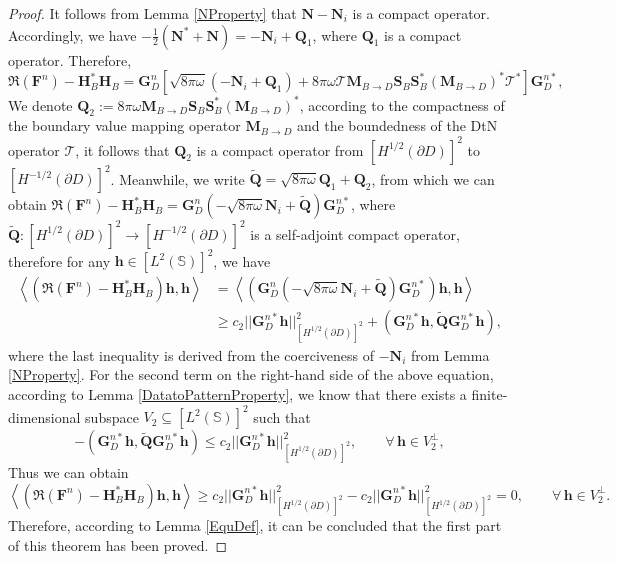 \documentclass[11pt,reqno,twoside]{amsart}
\theoremstyle{definition}
\theoremstyle{remark}
\numberwithin{equation}{section}
\begin{document}
\begin{proof}
It follows from Lemma \ref{NProperty} that $\mathbf N-\mathbf N_{i}$ is a compact operator. Accordingly, we have $-\frac{1}{2}\left( \mathbf N^*+\mathbf N\right)=-\mathbf N_{i} +\mathbf Q_1$, where $\mathbf Q_1$ is a compact operator. Therefore,
	$$
	\Re\left( \mathbf F^n\right)-\mathbf H^*_B\mathbf H_B =\mathbf G_D^n \left[\sqrt{8\pi\omega} \left( -\mathbf N_i+\mathbf Q_1\right) + 8\pi\omega \bm{\mathcal{T}} \mathbf M_{B \to D}\mathbf S_B\mathbf S^*_B\left( \mathbf M_{B \to D}\right) ^* \bm{\mathcal{T}}^* \right] \mathbf G_D^{n*},
	$$
	We denote $\mathbf Q_2:=8\pi\omega \mathbf M_{B \to D}\mathbf S_B\mathbf S^*_B\left( \mathbf M_{B \to D}\right) ^*$, according to the compactness of the boundary value mapping operator $\mathbf M_{B \to D}$ and the boundedness of the DtN operator $\bm{\mathcal{T}}$, it follows that $\mathbf Q_2$ is a compact operator from $ \left[H^{1/2}\left(\partial D \right) \right]^2 $ to $\left[H^{-1/2}\left(\partial D \right) \right]^2$. Meanwhile, we write $\mathbf{\tilde{Q}}=\sqrt{8\pi\omega} \mathbf Q_1+\mathbf Q_2$, from which we can obtain $\Re\left( \mathbf F^n\right)-\mathbf H^*_B\mathbf H_B = \mathbf G_D^n \left( -\sqrt{8\pi\omega} \mathbf N_{i}+\mathbf{\tilde{Q}} \right) \mathbf G_D^{n*}$, where $\mathbf{\tilde{Q}}:\left[H^{1/2}\left(\partial D \right) \right]^2  \to \left[H^{-1/2}\left(\partial D \right) \right]^2$ is a self-adjoint compact operator, therefore for any $\mathbf h \in \left[L^{2}\left(\mathbb S \right) \right]^2$, we have
		\begin{equation*}\begin{aligned}
				\left\langle \left( \Re\left( \mathbf F^n\right)-\mathbf H^*_B\mathbf H_B\right) \mathbf h, \mathbf h\right\rangle 
				&= \left\langle \left(\mathbf G_D^n \left( -\sqrt{8\pi\omega} \mathbf N_{i}+\mathbf{\tilde{Q}} \right) \mathbf G_D^{n*} \right) \mathbf h, \mathbf h\right\rangle  \\
				&\geq c_2 || \mathbf G_D^{n*} \mathbf h ||^2_{\left[H^{1/2}\left(\partial D \right) \right]^2} + \left(  \mathbf G_D^{n*} \mathbf h, \mathbf{\tilde{Q}}\mathbf G_D^{n*} \mathbf h \right) ,
		\end{aligned}\end{equation*}
		where the last inequality is derived from the coerciveness of $-\mathbf N_{i}$ from Lemma \ref{NProperty}. For the second term on the right-hand side of the above equation, according to Lemma \ref{DatatoPatternProperty}, we know that there exists a finite-dimensional subspace $V_2 \subseteq \left[L^{2}\left(\mathbb S \right) \right]^2$ such that
		$$
		 -\left(  \mathbf G_D^{n*} \mathbf h, \mathbf{\tilde{Q}}\mathbf G_D^{n*} \mathbf h \right) \leq c_2 ||\mathbf G_D^{n*} \mathbf h||_{\left[H^{1/2}\left(\partial D\right) \right] ^2} ^2, \qquad \forall \,\mathbf h \in V_2^\perp,
		$$
		Thus we can obtain 
		$$
		\left\langle \left( \Re\left( \mathbf F^n\right)-\mathbf H^*_B\mathbf H_B\right) \mathbf h, \mathbf h\right\rangle  \geq c_2 || \mathbf G_D^{n*} \mathbf h ||^2_{\left[H^{1/2}\left(\partial D \right) \right]^2} - c_2 ||\mathbf G_D^{n*} \mathbf h||_{\left[H^{1/2}\left(\partial D\right) \right] ^2} ^2=0,\qquad \forall \,\mathbf h\in V_2^\perp.
		$$
		Therefore, according to Lemma \ref{EquDef}, it can be concluded that the first part of this theorem has been proved.


\end{proof}
\end{document}
